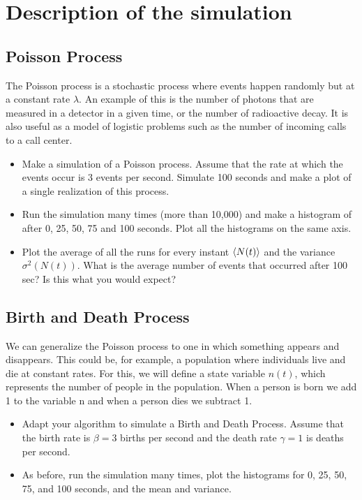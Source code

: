 \documentclass[main.tex]{subfiles}
\begin{document}
\section{Description of the simulation}

\subsection{Poisson Process}

The Poisson process is a stochastic process where events happen randomly but at a constant rate $\lambda$. 
An example of this is the number of photons that are measured in a detector in a given time, or the number of radioactive decay. 
It is also useful as a model of logistic problems such as the number of incoming calls to a call center. 

\begin{itemize}
    \item Make a simulation of a Poisson process. Assume that the rate at which the events occur is 3 events per second. Simulate 100 seconds and make a plot of a single realization of this process.
    \item Run the simulation many times (more than 10,000) and make a histogram of  after 0, 25, 50, 75 and 100 seconds. Plot all the histograms on the same axis.
    \item Plot the average of all the runs for every instant $\expval{N(t)}$ and the variance $\sigma^2(N(t))$. What is the average number of events that occurred after 100 sec? Is this what you would expect?
\end{itemize}

\subsection{Birth and Death Process}

We can generalize the Poisson process to one in which something appears and disappears. 
This could be, for example, a population where individuals live and die at constant rates. 
For this, we will define a state variable $n(t)$, which represents the number of people in the population. 
When a person is born we add 1 to the variable n and when a person dies we subtract 1. 

\begin{itemize}
    \item Adapt your algorithm to simulate a Birth and Death Process. Assume that the birth rate is $\beta=3$ births per second and the death rate $\gamma=1$ is deaths per second.
    \item As before, run the simulation many times, plot the histograms for 0, 25, 50, 75, and 100 seconds, and the mean and variance.
\end{itemize}
\end{document}
